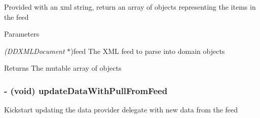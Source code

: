\label{interface_p_b_data_provider_aa087e818d083884b3244df839cfcf2b2}
Provided with an xml string, return an array of objects representing the items in the feed 
\begin{DoxyParams}{Parameters}
\item[{\em (DDXMLDocument}]$\ast$)feed The XML feed to parse into domain objects \end{DoxyParams}
\begin{DoxyReturn}{Returns}
The mutable array of objects 
\end{DoxyReturn}
\hypertarget{interface_p_b_data_provider_a3acc1d48d6270ed90a9700c024994d98}{
\subsubsection[{updateDataWithPullFromFeed}]{\setlength{\rightskip}{0pt plus 5cm}-\/ (void) updateDataWithPullFromFeed }}
\label{interface_p_b_data_provider_a3acc1d48d6270ed90a9700c024994d98}
Kickstart updating the data provider delegate with new data from the feed 

